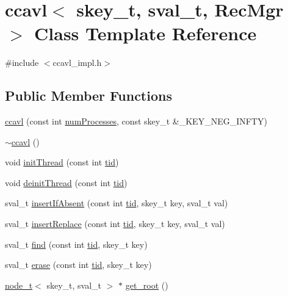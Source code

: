 \hypertarget{classccavl}{}\section{ccavl$<$ skey\+\_\+t, sval\+\_\+t, Rec\+Mgr $>$ Class Template Reference}
\label{classccavl}


{\ttfamily \#include $<$ccavl\+\_\+impl.\+h$>$}

\subsection*{Public Member Functions}
\begin{DoxyCompactItemize}
\item 
\hyperlink{classccavl_ae75621f90c06705d71d42823ce27415b}{ccavl} (const int \hyperlink{testing_8cpp_aa085812188e21ede75351d88b9b2c30d}{num\+Processes}, const skey\+\_\+t \&\+\_\+\+K\+E\+Y\+\_\+\+N\+E\+G\+\_\+\+I\+N\+F\+TY)
\item 
\hyperlink{classccavl_a4ef8b4a550508b4405c69c179d068346}{$\sim$ccavl} ()
\item 
void \hyperlink{classccavl_a3c5a7ce30103bd377abd52c94a0021e4}{init\+Thread} (const int \hyperlink{microbench_2main_8cpp_a9ca9869868fe7e7a38a921cc7de4103f}{tid})
\item 
void \hyperlink{classccavl_a6515857749b20bf66903f66db6d33247}{deinit\+Thread} (const int \hyperlink{microbench_2main_8cpp_a9ca9869868fe7e7a38a921cc7de4103f}{tid})
\item 
sval\+\_\+t \hyperlink{classccavl_acc5cd8e2ab2c439480b38a49462353cb}{insert\+If\+Absent} (const int \hyperlink{microbench_2main_8cpp_a9ca9869868fe7e7a38a921cc7de4103f}{tid}, skey\+\_\+t key, sval\+\_\+t val)
\item 
sval\+\_\+t \hyperlink{classccavl_a1bccdb9a78b965bc23239ca142843701}{insert\+Replace} (const int \hyperlink{microbench_2main_8cpp_a9ca9869868fe7e7a38a921cc7de4103f}{tid}, skey\+\_\+t key, sval\+\_\+t val)
\item 
sval\+\_\+t \hyperlink{classccavl_ad6102621e94aacf02a6ae441c6b2010a}{find} (const int \hyperlink{microbench_2main_8cpp_a9ca9869868fe7e7a38a921cc7de4103f}{tid}, skey\+\_\+t key)
\item 
sval\+\_\+t \hyperlink{classccavl_ad574827b3181dfcc2758d33a920ef888}{erase} (const int \hyperlink{microbench_2main_8cpp_a9ca9869868fe7e7a38a921cc7de4103f}{tid}, skey\+\_\+t key)
\item 
\hyperlink{structnode__t}{node\+\_\+t}$<$ skey\+\_\+t, sval\+\_\+t $>$ $\ast$ \hyperlink{classccavl_ad6813e2b580885b73267281299aaf91b}{get\+\_\+root} ()

\end{DoxyCompactItemize}
